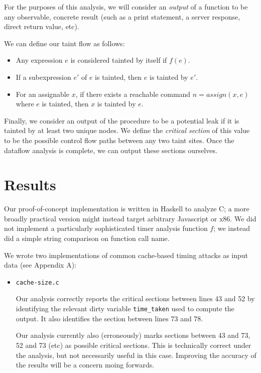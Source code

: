 \documentclass[12pt]{article}
\begin{document}
\begin{multicols*}{2}
  For the purposes of this analysis, we will consider an \textit{output} of a
  function to be any observable, concrete result (such as a print statement,
  a server response, direct return value, etc).

  We can define our taint flow as follows:

  \begin{itemize}
    \item Any expression $e$ is considered tainted by itself if $f(e)$.
    \item If a subexpression $e'$ of $e$ is tainted, then $e$ is tainted by
      $e'$.
    \item For an assignable $x$, if there exists a reachable command
      $n = assign(x,e)$ where $e$ is tainted, then $x$ is tainted by $e$.
  \end{itemize}

  Finally, we consider an output of the procedure to be a potential leak if
  it is tainted by at least two unique nodes. We define the
  \textit{critical section} of this value to be the possible control flow
  paths between any two taint sites. Once the dataflow analysis is complete, we
  can output these sections ourselves.

  \section{Results}

  Our proof-of-concept implementation is written in Haskell to analyze
  C; a more broadly practical version might instead target arbitrary
  Javascript or x86. We did not implement a particularly sophisticated
  timer analysis function $f$; we instead did a simple string
  comparison on function call name.

  We wrote two implementations of common cache-based timing attacks as input
  data (see Appendix A): \begin{itemize}

    \item \texttt{cache-size.c}

      Our analysis correctly reports the
  critical sections between lines 43 and 52 by identifying the relevant dirty
  variable \texttt{time\_taken} used to compute the output. It also identifies
  the section between lines 73 and 78.

  Our analysis currently also (erroneously) marks sections between 43 and 73,
  52 and 73 (etc) as possible critical sections. This is technically correct
  under the analysis, but not necessarily useful in this case. Improving the
  accuracy of the results will be a concern moing forwards.


\end{itemize}
\end{multicols*}
\end{document}
